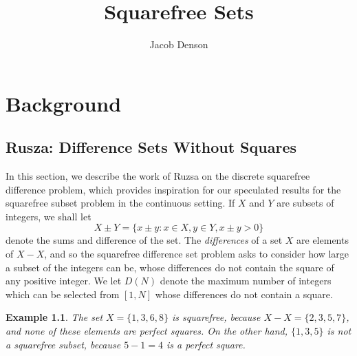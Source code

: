 \documentclass{report}
\title{Squarefree Sets}
\author{Jacob Denson}
\theoremstyle{plain}
\newtheorem*{example}{Example}
\theoremstyle{plain}
\begin{document}
\maketitle

\tableofcontents

\newpage

\chapter{Background}

\section{Rusza: Difference Sets Without Squares}

In this section, we describe the work of Ruzsa on the discrete squarefree difference problem, which provides inspiration for our speculated results for the squarefree subset problem in the continuous setting. If $X$ and $Y$ are subsets of integers, we shall let
%
\[ X \pm Y = \{ x \pm y: x \in X, y \in Y, x \pm y > 0 \} \]
%
denote the sums and difference of the set. The {\it differences} of a set $X$ are elements of $X - X$, and so the squarefree difference set problem asks to consider how large a subset of the integers can be, whose differences do not contain the square of any positive integer. We let $D(N)$ denote the maximum number of integers which can be selected from $[1,N]$ whose differences do not contain a square.

\begin{example}
    The set $X = \{ 1, 3, 6, 8 \}$ is squarefree, because $X - X = \{ 2, 3, 5, 7 \}$, and none of these elements are perfect squares. On the other hand, $\{ 1, 3, 5 \}$ is not a squarefree subset, because $5 - 1 = 4$ is a perfect square.
\end{example}
\end{document}
